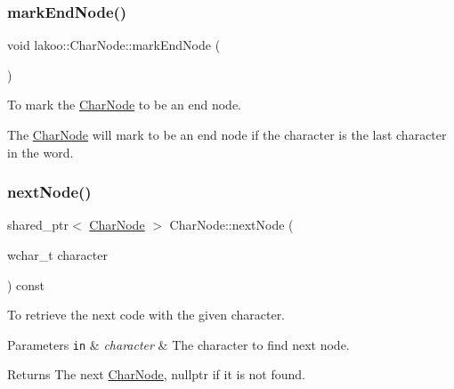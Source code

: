 \subsubsection{\texorpdfstring{mark\+End\+Node()}{markEndNode()}}
{\footnotesize\ttfamily void lakoo\+::\+Char\+Node\+::mark\+End\+Node (\begin{DoxyParamCaption}{ }\end{DoxyParamCaption})\hspace{0.3cm}{\ttfamily [inline]}}



To mark the \hyperlink{classlakoo_1_1_char_node}{Char\+Node} to be an end node. 

The \hyperlink{classlakoo_1_1_char_node}{Char\+Node} will mark to be an end node if the character is the last character in the word. \mbox{\label{classlakoo_1_1_char_node_ab73f4abe7136075ce7b96907d54465c6}} 
\subsubsection{\texorpdfstring{next\+Node()}{nextNode()}}
{\footnotesize\ttfamily shared\+\_\+ptr$<$ \hyperlink{classlakoo_1_1_char_node}{Char\+Node} $>$ Char\+Node\+::next\+Node (\begin{DoxyParamCaption}\item[{wchar\+\_\+t}]{character }\end{DoxyParamCaption}) const}



To retrieve the next code with the given character. 


\begin{DoxyParams}[1]{Parameters}
\mbox{\tt in}  & {\em character} & The character to find next node. \\
\hline
\end{DoxyParams}
\begin{DoxyReturn}{Returns}
The next \hyperlink{classlakoo_1_1_char_node}{Char\+Node}, nullptr if it is not found. 
\end{DoxyReturn}
\mbox{\label{classlakoo_1_1_char_node_aad471a4681970e4bc098209c56b95137}} 
